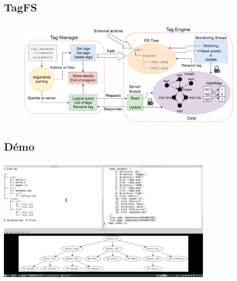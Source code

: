 \documentclass[10pt]{beamer}
\begin{document}
\subsection{TagFS}
\begin{frame}
    \frametitle{\subsecname}
    \begin{figure}
        \begin{center}
            \includegraphics[width=1\textwidth]{images/tagfs4.png}
        \end{center}
    \end{figure}
\end{frame}

\subsection{Démo}
\begin{frame}
    \frametitle{\subsecname}
    \begin{center}
        \includegraphics[width=0.8\textwidth]{images/video.png}
        \bigbreak
    \end{center}
\end{frame}

\end{document}
